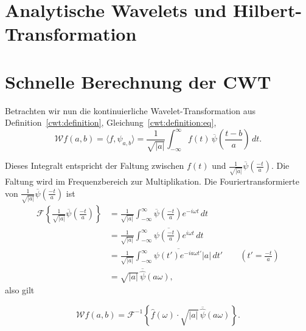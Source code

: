 \begin{refsection}


\section{Analytische Wavelets und Hilbert-Transformation}




\section{Schnelle Berechnung der CWT}

Betrachten wir nun die kontinuierliche Wavelet-Transformation aus Definition~\ref{cwt:definition}, Gleichung~\eqref{cwt:definition:eq},
\[
\mathcal{W}f (a,b)
=
\langle f,\psi_{a,b}\rangle
=
\frac{1}{\sqrt{|a|}}\int_{-\infty}^\infty f(t)\,
	\overline{\psi}\left(\frac{t-b}{a}\right)\,dt.
\]

Dieses Integralt entspricht der Faltung zwischen $f(t)$ und $\frac{1}{\sqrt{|a|}} \overline{\psi}\left(\frac{-t}{a}\right)$.
Die Faltung wird im Fre\-quenz\-bereich zur Multiplikation. 
Die Fouriertransformierte von $\frac{1}{\sqrt{|a|}} \overline{\psi}\left(\frac{-t}{a}\right)$ ist
\begin{align*}
	\mathcal{F}\left\lbrace \frac{1}{\sqrt{|a|}} \overline{\psi}\left(\frac{-t}{a}\right)\right\rbrace 
	&= \frac{1}{\sqrt{|a|}} \int_{-\infty}^{\infty}\overline{\psi}\left(\frac{-t}{a}\right)e^{-i\omega t}\, dt\\
	&= \frac{1}{\sqrt{|a|}} \overline{\int_{-\infty}^{\infty}\psi\left(\frac{-t}{a}\right)e^{i\omega t}\, dt}\\
	&= \frac{1}{\sqrt{|a|}} \overline{\int_{-\infty}^{\infty}\psi\left(t'\right)e^{-ia\omega t'} |a|\, dt'} \qquad \left(t' = \frac{-t}{a}\right)\\
	&= \sqrt{|a|} \, \overline{\hat{\psi}}\left(a\omega\right),
\end{align*}
 also gilt

\begin{equation}
\mathcal{W}f(a,b)
= \mathcal{F}^{-1}\left\lbrace\hat{f}(\omega)\cdot \sqrt{|a|}\, \overline{\hat{\psi}}\left(a\omega\right)\right\rbrace. \label{complex:fcwt}
\end{equation}


\end{refsection}
